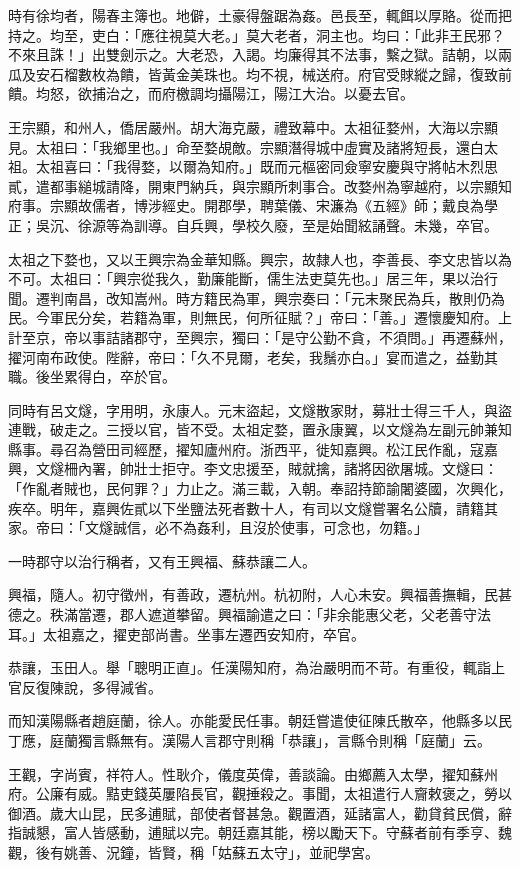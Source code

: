 \begin{pinyinscope}
時有徐均者，陽春主簿也。地僻，土豪得盤踞為姦。邑長至，輒餌以厚賂。從而把持之。均至，吏白：「應往視莫大老。」莫大老者，洞主也。均曰：「此非王民邪？不來且誅！」出雙劍示之。大老恐，入謁。均廉得其不法事，繫之獄。詰朝，以兩瓜及安石榴數枚為饋，皆黃金美珠也。均不視，械送府。府官受賕縱之歸，復致前饋。均怒，欲捕治之，而府檄調均攝陽江，陽江大治。以憂去官。

王宗顯，和州人，僑居嚴州。胡大海克嚴，禮致幕中。太祖征婺州，大海以宗顯見。太祖曰：「我鄉里也。」命至婺覘敵。宗顯潛得城中虛實及諸將短長，還白太祖。太祖喜曰：「我得婺，以爾為知府。」既而元樞密同僉寧安慶與守將帖木烈思貳，遣都事縋城請降，開東門納兵，與宗顯所刺事合。改婺州為寧越府，以宗顯知府事。宗顯故儒者，博涉經史。開郡學，聘葉儀、宋濂為《五經》師；戴良為學正；吳沉、徐源等為訓導。自兵興，學校久廢，至是始聞絃誦聲。未幾，卒官。

太祖之下婺也，又以王興宗為金華知縣。興宗，故隸人也，李善長、李文忠皆以為不可。太祖曰：「興宗從我久，勤廉能斷，儒生法吏莫先也。」居三年，果以治行聞。遷判南昌，改知嵩州。時方籍民為軍，興宗奏曰：「元末聚民為兵，散則仍為民。今軍民分矣，若籍為軍，則無民，何所征賦？」帝曰：「善。」遷懷慶知府。上計至京，帝以事詰諸郡守，至興宗，獨曰：「是守公勤不貪，不須問。」再遷蘇州，擢河南布政使。陛辭，帝曰：「久不見爾，老矣，我鬚亦白。」宴而遣之，益勤其職。後坐累得白，卒於官。

同時有呂文燧，字用明，永康人。元末盜起，文燧散家財，募壯士得三千人，與盜連戰，破走之。三授以官，皆不受。太祖定婺，置永康翼，以文燧為左副元帥兼知縣事。尋召為營田司經歷，擢知廬州府。浙西平，徙知嘉興。松江民作亂，寇嘉興，文燧柵內署，帥壯士拒守。李文忠援至，賊就擒，諸將因欲屠城。文燧曰：「作亂者賊也，民何罪？」力止之。滿三載，入朝。奉詔持節諭闍婆國，次興化，疾卒。明年，嘉興佐貳以下坐鹽法死者數十人，有司以文燧嘗署名公牘，請籍其家。帝曰：「文燧誠信，必不為姦利，且沒於使事，可念也，勿籍。」

一時郡守以治行稱者，又有王興福、蘇恭讓二人。

興福，隨人。初守徵州，有善政，遷杭州。杭初附，人心未安。興福善撫輯，民甚德之。秩滿當遷，郡人遮道攀留。興福諭遣之曰：「非余能惠父老，父老善守法耳。」太祖嘉之，擢吏部尚書。坐事左遷西安知府，卒官。

恭讓，玉田人。舉「聰明正直」。任漢陽知府，為治嚴明而不苛。有重役，輒詣上官反復陳說，多得減省。

而知漢陽縣者趙庭蘭，徐人。亦能愛民任事。朝廷嘗遣使征陳氏散卒，他縣多以民丁應，庭蘭獨言縣無有。漢陽人言郡守則稱「恭讓」，言縣令則稱「庭蘭」云。

王觀，字尚賓，祥符人。性耿介，儀度英偉，善談論。由鄉薦入太學，擢知蘇州府。公廉有威。黠吏錢英屢陷長官，觀捶殺之。事聞，太祖遣行人齎敕褒之，勞以御酒。歲大山昆，民多逋賦，部使者督甚急。觀置酒，延諸富人，勸貸貧民償，辭指誠懇，富人皆感動，逋賦以完。朝廷嘉其能，榜以勵天下。守蘇者前有季亨、魏觀，後有姚善、況鐘，皆賢，稱「姑蘇五太守」，並祀學宮。


\end{pinyinscope}
